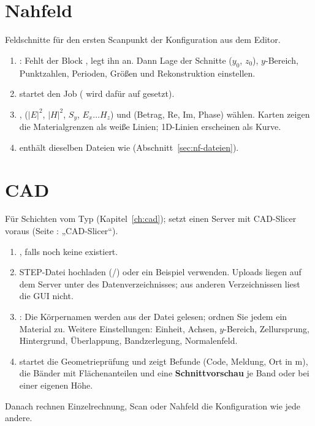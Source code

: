 \section{Nahfeld}
Feldschnitte für den ersten Scanpunkt der Konfiguration aus dem Editor.
\begin{enumerate}
  \item {}: Fehlt der Block , legt  ihn an.
        Dann Lage der Schnitte ($y_0$, $z_0$), $y$-Bereich, Punktzahlen, Perioden, Größen und Rekonstruktion einstellen.
  \item {} startet den Job ( wird dafür auf  gesetzt).
  \item {},  ($|E|^2$, $|H|^2$, $S_y$, $E_x\ldots H_z$) und  (Betrag, Re, Im, Phase)
        wählen. Karten zeigen die Materialgrenzen als weiße Linien; 1D-Linien erscheinen als Kurve.
  \item {} enthält dieselben Dateien wie  (Abschnitt~\ref{sec:nf-dateien}).
\end{enumerate}

\section{CAD}
Für Schichten vom Typ  (Kapitel~\ref{ch:cad}); setzt einen Server mit CAD-Slicer voraus (Seite :
„CAD-Slicer“).
\begin{enumerate}
  \item {}, falls noch keine existiert.
  \item STEP-Datei hochladen (/) oder ein Beispiel verwenden. Uploads liegen auf dem Server
        unter  des Datenverzeichnisses; aus anderen Verzeichnissen liest die GUI nicht.
  \item {}: Die Körpernamen werden aus der Datei gelesen; ordnen Sie jedem ein Material zu.
        Weitere Einstellungen: Einheit, Achsen, $y$-Bereich, Zellursprung, Hintergrund, Überlappung, Bandzerlegung,
        Normalenfeld.
  \item {} startet die Geometrieprüfung und zeigt Befunde (Code, Meldung, Ort in \textmu m), die Bänder mit
        Flächenanteilen und eine \textbf{Schnittvorschau} je Band oder bei einer eigenen Höhe.
\end{enumerate}
Danach rechnen Einzelrechnung, Scan oder Nahfeld die Konfiguration wie jede andere.

